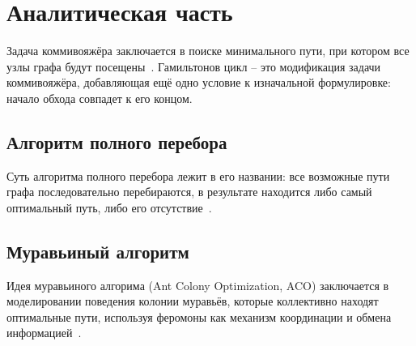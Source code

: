 \chapter{Аналитическая часть}

Задача коммивояжёра заключается в поиске минимального пути, при котором все узлы графа будут посещены~\cite{lit2}.
Гамильтонов цикл -- это модификация задачи коммивояжёра, добавляющая ещё одно условие к изначальной формулировке: начало обхода совпадет к его концом.

\section{Алгоритм полного перебора}

Суть алгоритма полного перебора лежит в его названии: все возможные пути графа последовательно перебираются, в результате находится либо самый оптимальный путь, либо его отсутствие~\cite{lit3}.

\section{Муравьиный алгоритм}

Идея муравьиного алгорима (Ant Colony Optimization, ACO) заключается в моделировании поведения колонии муравьёв, которые коллективно находят оптимальные пути, используя феромоны как механизм координации и обмена информацией~\cite{lit4}.

